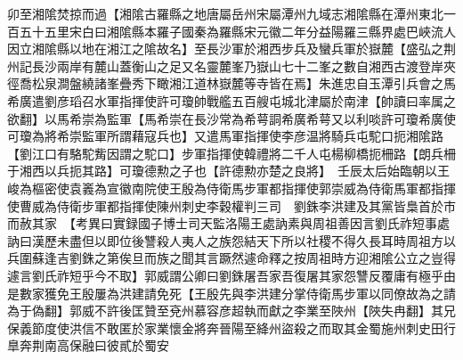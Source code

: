 卯至湘隂焚掠而過【湘隂古羅縣之地唐屬岳州宋屬潭州九域志湘隂縣在潭州東北一百五十五里宋白曰湘隂縣本羅子國秦為羅縣宋元徽二年分益陽羅三縣界處巴峽流人因立湘隂縣以地在湘江之隂故名】至長沙軍於湘西步兵及蠻兵軍於嶽麓【盛弘之荆州記長沙兩岸有麓山蓋衡山之足又名靈麓峯乃嶽山七十二峯之數自湘西古渡登岸夾徑喬松泉澗盤繞諸峯疊秀下瞰湘江道林嶽麓等寺皆在焉】朱進忠自玉潭引兵會之馬希廣遣劉彦瑫召水軍指揮使許可瓊帥戰艦五百艘屯城北津屬於南津【帥讀曰率属之欲翻】以馬希崇為監軍【馬希崇在長沙常為希萼詷希廣希萼又以利啖許可瓊希廣使可瓊為將希崇監軍所謂藉寇兵也】又遣馬軍指揮使李彦温將騎兵屯駝口扼湘隂路【劉江口有駱駝觜因謂之駝口】步軍指揮使韓禮將二千人屯楊柳橋扼柵路【朗兵柵于湘西以兵扼其路】可瓊德勲之子也【許德勲亦楚之良將】　壬辰太后始臨朝以王峻為樞密使袁㠖為宣徽南院使王殷為侍衛馬步軍都指揮使郭崇威為侍衛馬軍都指揮使曹威為侍衛步軍都指揮使陳州刺史李穀權判三司　劉銖李洪建及其黨皆梟首於市而赦其家　【考異曰實録國子博士司天監洛陽王處訥素與周祖善因言劉氏祚短事處訥曰漢歷未盡但以即位後讐殺人夷人之族怨結天下所以社稷不得久長耳時周祖方以兵圍蘇逢吉劉銖之第俟旦而族之聞其言蹶然遽命釋之按周祖時方迎湘隂公立之豈得遽言劉氏祚短乎今不取】郭威謂公卿曰劉銖屠吾家吾復屠其家怨讐反覆庸有極乎由是數家獲免王殷屢為洪建請免死【王殷先與李洪建分掌侍衛馬步軍以同僚故為之請為于偽翻】郭威不許後匡贊至兗州慕容彦超執而獻之李業至陜州【陜失冉翻】其兄保義節度使洪信不敢匿於家業懷金將奔晉陽至絳州盜殺之而取其金蜀施州刺史田行臯奔荆南高保融曰彼貳於蜀安

